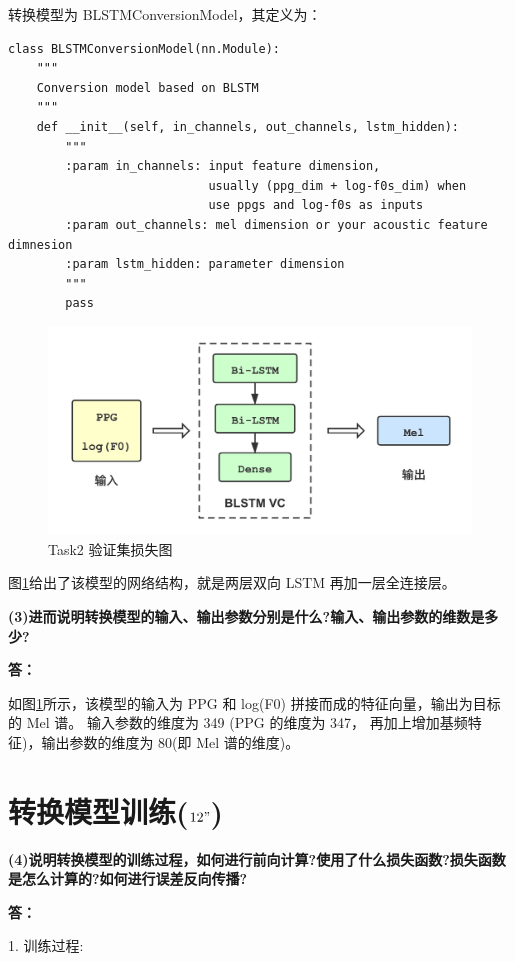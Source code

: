 \documentclass[degree=project,degree-type=project,cjk-font=noto]{thuthesis}
\begin{document}
转换模型为 BLSTMConversionModel，其定义为：

  \begin{verbatim}
class BLSTMConversionModel(nn.Module):
    """
    Conversion model based on BLSTM
    """
    def __init__(self, in_channels, out_channels, lstm_hidden):
        """
        :param in_channels: input feature dimension,
                            usually (ppg_dim + log-f0s_dim) when
                            use ppgs and log-f0s as inputs
        :param out_channels: mel dimension or your acoustic feature dimnesion
        :param lstm_hidden: parameter dimension
        """
        pass
\end{verbatim}

\begin{figure}[h]
\centering%
\includegraphics[width=.75\linewidth]{BLSTM_VC.png}
  \caption{Task2 验证集损失图}
  \label{fig:BLSTM_VC}
\end{figure}

图\ref{fig:BLSTM_VC}给出了该模型的网络结构，就是两层双向 LSTM 再加一层全连接层。


\textbf{(3)进而说明转换模型的输入、输出参数分别是什么?输入、输出参数的维数是多少?}

\textbf{答：}

如图\ref{fig:BLSTM_VC}所示，该模型的输入为 PPG 和 log(F0) 拼接而成的特征向量，输出为目标的 Mel 谱。
输入参数的维度为 349 (PPG 的维度为 347， 再加上增加基频特征)，输出参数的维度为 80(即 Mel 谱的维度)。

\section{转换模型训练($12"$)}

\textbf{(4)说明转换模型的训练过程，如何进行前向计算?使用了什么损失函数?损失函数是怎么计算的?如何进行误差反向传播?}

\textbf{答：}

1. 训练过程:
\end{document}
